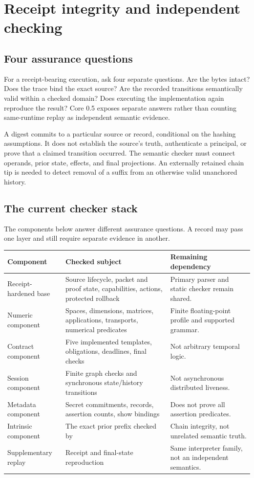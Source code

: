 \documentclass[11pt]{article}
\begin{document}
\section{Receipt integrity and independent checking}
\subsection{Four assurance questions}
For a receipt-bearing execution, ask four separate questions. Are the bytes intact? Does the trace bind the exact source? Are the recorded transitions semantically valid within a checked domain? Does executing the implementation again reproduce the result? Core 0.5 exposes separate answers rather than counting same-runtime replay as independent semantic evidence. \cite{o05}

A digest commits to a particular source or record, conditional on the hashing assumptions. It does not establish the source's truth, authenticate a principal, or prove that a claimed transition occurred. The semantic checker must connect operands, prior state, effects, and final projections. An externally retained chain tip is needed to detect removal of a suffix from an otherwise valid unanchored history.

\subsection{The current checker stack}
The components below answer different assurance questions. A record may pass one layer and still require separate evidence in another.
\begin{longtable}{P{0.24\textwidth}P{0.40\textwidth}P{0.27\textwidth}}
\toprule Component & Checked subject & Remaining dependency\\\midrule\endhead
Receipt-hardened base & Source lifecycle, packet and proof state, capabilities, actions, protected rollback & Primary parser and static checker remain shared.\\
Numeric component & Spaces, dimensions, matrices, applications, transports, numerical predicates & Finite floating-point profile and supported grammar.\\
Contract component & Five implemented templates, obligations, deadlines, final checks & Not arbitrary temporal logic.\\
Session component & Finite graph checks and synchronous state/history transitions & Not asynchronous distributed liveness.\\
Metadata component & Secret commitments, records, assertion counts, show bindings & Does not prove all assertion predicates.\\
Intrinsic component & The exact prior prefix checked by  & Chain integrity, not unrelated semantic truth.\\
Supplementary replay & Receipt and final-state reproduction & Same interpreter family, not an independent semantics.\\\bottomrule
\end{longtable}
\end{document}

